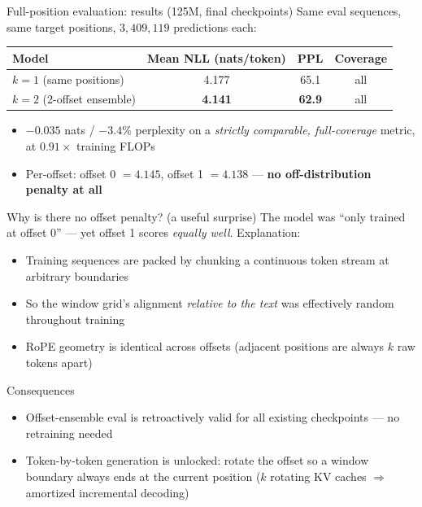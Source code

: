 \documentclass[10pt,aspectratio=169]{beamer}
\newcommand{\good}[1]{\textcolor{okgreen}{#1}}
\begin{document}
\begin{frame}{Full-position evaluation: results (125M, final checkpoints)}
  Same eval sequences, same target positions, $3{,}409{,}119$ predictions each:

  \vspace{0.5em}
  \centering
  \begin{tabular}{lccc}
    \toprule
    Model & Mean NLL (nats/token) & PPL & Coverage \\
    \midrule
    $k{=}1$ (same positions) & 4.177 & 65.1 & all \\
    $k{=}2$ (2-offset ensemble) & \good{\textbf{4.141}} & \good{\textbf{62.9}} & all \\
    \bottomrule
  \end{tabular}

  \vspace{1em}
  \begin{itemize}
    \item \good{$-0.035$ nats / $-3.4\%$ perplexity} on a \emph{strictly
          comparable, full-coverage} metric, at $0.91\times$ training FLOPs
    \item Per-offset: offset 0 $= 4.145$, offset 1 $= 4.138$ ---
          \textbf{no off-distribution penalty at all}
  \end{itemize}
\end{frame}

\begin{frame}{Why is there no offset penalty? (a useful surprise)}
  The model was ``only trained at offset 0'' --- yet offset 1 scores
  \emph{equally well}. Explanation:

  \vspace{0.4em}
  \begin{itemize}
    \item Training sequences are packed by chunking a continuous token stream
          at arbitrary boundaries
    \item So the window grid's alignment \emph{relative to the text} was
          effectively random throughout training
    \item RoPE geometry is identical across offsets (adjacent positions are
          always $k$ raw tokens apart)
  \end{itemize}

  \vspace{0.5em}
  \begin{block}{Consequences}
    \begin{itemize}
      \item Offset-ensemble eval is \good{retroactively valid} for all existing
            checkpoints --- no retraining needed
      \item Token-by-token \good{generation is unlocked}: rotate the offset so a
            window boundary always ends at the current position
            ($k$ rotating KV caches $\Rightarrow$ amortized incremental decoding)
    \end{itemize}
  \end{block}
\end{frame}
\end{document}
